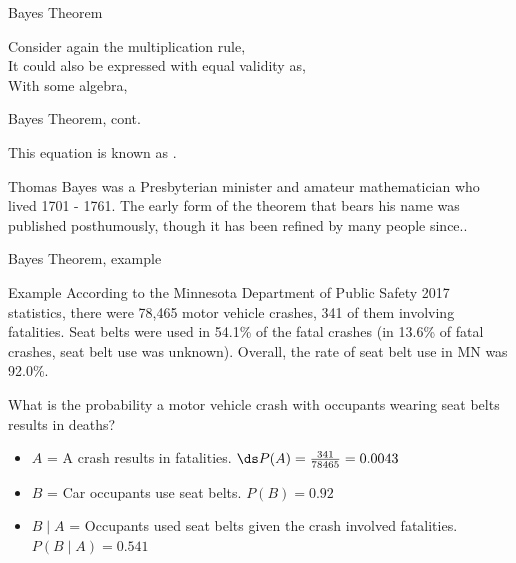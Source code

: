 \documentclass[xcolor=table, aspectratio=169, bigger, handout]{beamer}
\begin{document}
\begin{frame}{Bayes Theorem}

\begin{block}{}
Consider again the multiplication rule,\\ \smallskip
{} \medskip
\pause
It could also be expressed with equal validity as,\\ \smallskip
{} \medskip
\pause
With some algebra, \\ \smallskip
{} \smallskip
\pause
{}
\end{block}
\end{frame}

\begin{frame}{Bayes Theorem, cont.}

\begin{block}{}
 \medskip

This equation is known as .
\end{block}

\begin{exampleblock}{}
Thomas Bayes was a Presbyterian minister and amateur mathematician who lived 1701 - 1761. The early form of the theorem that bears his name was published posthumously, though it has been refined by many people since..
\end{exampleblock}
\end{frame}

\begin{frame}{Bayes Theorem, example}
\begin{exampleblock}{Example}
According to the Minnesota Department of Public Safety 2017 statistics, there were 78,465 motor vehicle crashes, 341 of them involving fatalities. Seat belts were used in 54.1\% of the fatal crashes (in 13.6\% of fatal crashes, seat belt use was unknown). Overall, the rate of seat belt use in MN was 92.0\%. \\ 
\medskip

What is the probability a motor vehicle crash with occupants wearing seat belts results in deaths?

\begin{itemize}
\pause\item $A$ = A crash results in fatalities. $\ds P(A) = \frac{341}{78465} = 0.0043$

\pause\item $B$ = Car occupants use seat belts. $P(B) = 0.92$

\pause\item $B \mid A$ = Occupants used seat belts given the crash involved fatalities.\\ \smallskip
$P(B \mid A) = 0.541$
\end{itemize}

\end{exampleblock}
\end{frame}
\end{document}
